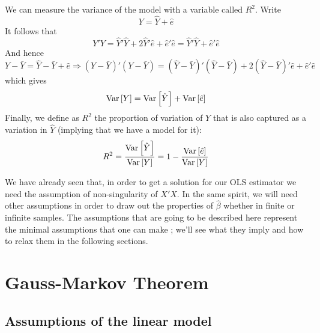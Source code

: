 \begin{definition}
We can measure the variance of the model with a variable called $R^2$. Write $$Y = \hat{Y} + \hat{e}$$ It follows that $$Y'Y = \hat{Y}'\hat{Y} + 2\hat{Y}'\hat{e} + \hat{e}'\hat{e} = \hat{Y}'\hat{Y} + \hat{e}'\hat{e} $$
And hence $Y - \bar{Y} = \hat{Y} - \bar{Y} + \hat{e} \Rightarrow (Y - \bar{Y})'(Y - \bar{Y}) = (\hat{Y} - \bar{Y})'(\hat{Y} - \bar{Y}) + 2(\hat{Y} - \bar{Y})'\hat{e} + \hat{e}'\hat{e}$ which gives $$\operatorname{Var}\left[Y\right] = \operatorname{Var}\left[\hat{Y}\right] + \operatorname{Var}\left[\hat{e}\right]$$ Finally, we define as $R^2$ the proportion of variation of $Y$ that is also captured as a variation in $\hat{Y}$ (implying that we have a model for it): $$R^2 = \frac{\operatorname{Var}\left[\hat{Y}\right]}{\operatorname{Var}\left[Y\right]} = 1 - \frac{\operatorname{Var}\left[\hat{e}\right]}{\operatorname{Var}\left[Y\right]} $$
\end{definition}

We have already seen that, in order to get a solution for our OLS estimator we need the assumption of non-singularity of $X'X$. In the same spirit, we will need other assumptions in order to draw out the properties of $\hat\beta$ whether in finite or infinite samples. The assumptions that are going to be described here represent the minimal assumptions that one can make ; we'll see what they imply and how to relax them in the following sections.

\section{Gauss-Markov Theorem}

\subsection{Assumptions of the linear model}

